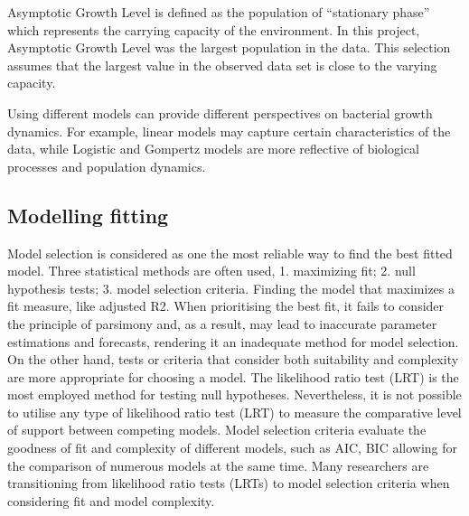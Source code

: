 \documentclass[11pt]{article}
\begin{document}
Asymptotic Growth Level is defined as the population of “stationary phase” which represents the carrying capacity of the environment\cite{peleg2011}. In this project, Asymptotic Growth Level was the largest population in the data. This selection assumes that the largest value in the observed data set is close to the varying capacity.

Using different models can provide different perspectives on bacterial growth dynamics. For example, linear models may capture certain characteristics of the data, while Logistic and Gompertz models are more reflective of biological processes and population dynamics.

\subsection{Modelling fitting}
Model selection is considered as one the most reliable way to find the best fitted model. 
Three statistical methods are often used, 1. maximizing fit; 2. null hypothesis tests; 3. model selection criteria\cite{johnson2004}.  Finding the model that maximizes a fit measure, like adjusted R2. 
When prioritising the best fit, it fails to consider the principle of parsimony and, as a result, may lead to inaccurate parameter estimations and forecasts, rendering it an inadequate method for model selection. On the other hand, tests or criteria that consider both suitability and complexity are more appropriate for choosing a model.
The likelihood ratio test (LRT) is the most employed method for testing null hypotheses. Nevertheless, it is not possible to utilise any type of likelihood ratio test (LRT) to measure the comparative level of support between competing models.
Model selection criteria evaluate the goodness of fit and complexity of different models, such as AIC, BIC allowing for the comparison of numerous models at the same time. 
Many researchers are transitioning from likelihood ratio tests (LRTs) to model selection criteria when considering fit and model complexity\cite{posada2003}. 
\end{document}
